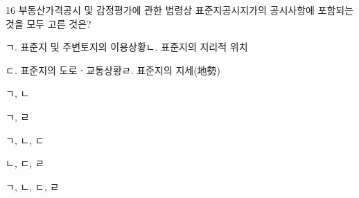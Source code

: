 \begin{question}{16}
부동산가격공시 및 감정평가에 관한 법령상 표준지공시지가의 공시사항에 포함되는 것을 모두 고른 것은?
\begin{framedtext}
ㄱ. 표준지 및 주변토지의 이용상황\quad ㄴ. 표준지의 지리적 위치 \par
ㄷ. 표준지의 도로ㆍ교통상황\quad ㄹ. 표준지의 지세(地勢) \par
\end{framedtext}
\begin{choices}
  \item ㄱ, ㄴ
  \item ㄱ, ㄹ
  \item ㄱ, ㄴ, ㄷ
  \item ㄴ, ㄷ, ㄹ
  \item ㄱ, ㄴ, ㄷ, ㄹ
\end{choices}
\end{question}
